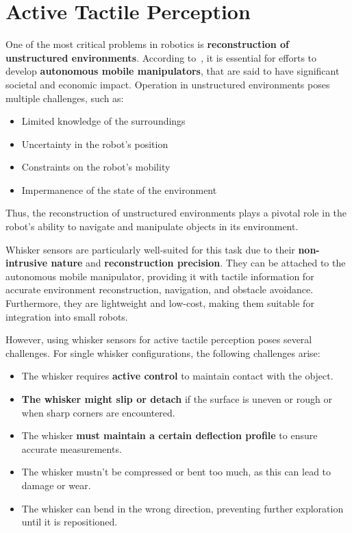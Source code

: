 \section{Active Tactile Perception}
One of the most critical problems in robotics is \textbf{reconstruction of unstructured environments}.
According to~\textcite{how-can-robots-succeed}, it is essential for efforts to develop \textbf{autonomous mobile manipulators}, that are said to have significant societal and economic impact.
Operation in unstructured environments poses multiple challenges, such as:
\begin{itemize}
    \item Limited knowledge of the surroundings
    \item Uncertainty in the robot's position
    \item Constraints on the robot's mobility
    \item Impermanence of the state of the environment
\end{itemize}
Thus, the reconstruction of unstructured environments plays a pivotal role in the robot's ability to navigate and manipulate objects in its environment.

Whisker sensors are particularly well-suited for this task due to their \textbf{non-intrusive nature} and \textbf{reconstruction precision}.
They can be attached to the autonomous mobile manipulator, providing it with tactile information for accurate environment reconstruction, navigation, and obstacle avoidance.
Furthermore, they are lightweight and low-cost, making them suitable for integration into small robots.

However, using whisker sensors for active tactile perception poses several challenges.
For single whisker configurations, the following challenges arise:
\begin{itemize}
    \item The whisker requires \textbf{active control} to maintain contact with the object.
    \item \textbf{The whisker might slip or detach} if the surface is uneven or rough or when sharp corners are encountered.
    \item The whisker \textbf{must maintain a certain deflection profile} to ensure accurate measurements.
    \item The whisker mustn't be compressed or bent too much, as this can lead to damage or wear.
    \item The whisker can bend in the wrong direction, preventing further exploration until it is repositioned.
\end{itemize}

